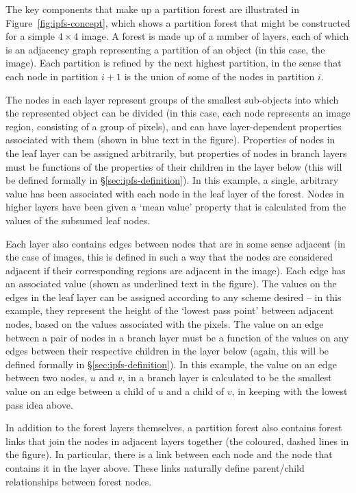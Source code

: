 \newpage

The key components that make up a partition forest are illustrated in Figure~\ref{fig:ipfs-concept}, which shows a partition forest that might be constructed for a simple $4 \times 4$ image. A forest is made up of a number of layers, each of which is an adjacency graph representing a partition of an object (in this case, the image). Each partition is refined by the next highest partition, in the sense that each node in partition $i+1$ is the union of some of the nodes in partition $i$.

The nodes in each layer represent groups of the smallest sub-objects into which the represented object can be divided (in this case, each node represents an image region, consisting of a group of pixels), and can have layer-dependent properties associated with them (shown in blue text in the figure). Properties of nodes in the leaf layer can be assigned arbitrarily, but properties of nodes in branch layers must be functions of the properties of their children in the layer below (this will be defined formally in \S\ref{sec:ipfs-definition}). In this example, a single, arbitrary value has been associated with each node in the leaf layer of the forest. Nodes in higher layers have been given a `mean value' property that is calculated from the values of the subsumed leaf nodes.

Each layer also contains edges between nodes that are in some sense adjacent (in the case of images, this is defined in such a way that the nodes are considered adjacent if their corresponding regions are adjacent in the image). Each edge has an associated value (shown as underlined text in the figure). The values on the edges in the leaf layer can be assigned according to any scheme desired -- in this example, they represent the height of the `lowest pass point' between adjacent nodes, based on the values associated with the pixels. The value on an edge between a pair of nodes in a branch layer must be a function of the values on any edges between their respective children in the layer below (again, this will be defined formally in \S\ref{sec:ipfs-definition}). In this example, the value on an edge between two nodes, $u$ and $v$, in a branch layer is calculated to be the smallest value on an edge between a child of $u$ and a child of $v$, in keeping with the lowest pass idea above.

In addition to the forest layers themselves, a partition forest also contains forest links that join the nodes in adjacent layers together (the coloured, dashed lines in the figure). In particular, there is a link between each node and the node that contains it in the layer above. These links naturally define parent/child relationships between forest nodes.


